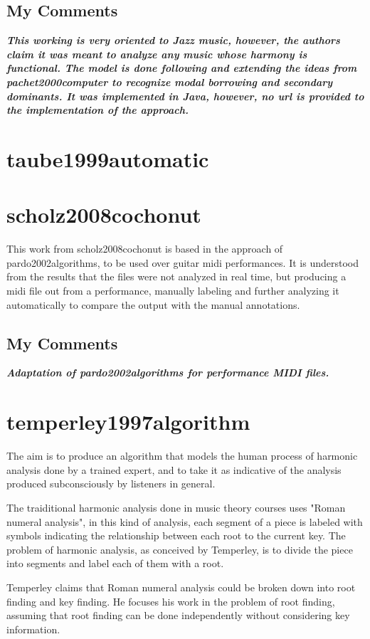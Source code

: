   \subsection{My Comments}
  \emph{\textbf{
    This working is very oriented to Jazz music, however, the authors claim it was meant to analyze any music whose harmony is functional. The model is done following and extending the ideas from pachet2000computer to recognize modal borrowing and secondary dominants. It was implemented in Java, however, no url is provided to the implementation of the approach.
  }}
\section{taube1999automatic }
\section{scholz2008cochonut }
  This work from scholz2008cochonut is based in the approach of pardo2002algorithms, to be used over guitar midi performances. It is understood from the results that the files were not analyzed in real time, but producing a midi file out from a performance, manually labeling and further analyzing it automatically to compare the output with the manual annotations.
  \subsection{My Comments}
  \emph{\textbf{
    Adaptation of pardo2002algorithms for performance MIDI files.
  }}
\section{temperley1997algorithm }
  The aim is to produce an algorithm that models the human process of harmonic analysis done by a trained expert, and to take it as indicative of the analysis produced subconsciously by listeners in general.

  The traiditional harmonic analysis done in music theory courses uses "Roman numeral analysis", in this kind of analysis, each segment of a piece is labeled with symbols indicating the relationship between each root to the current key. The problem of harmonic analysis, as conceived by Temperley, is to divide the piece into segments and label each of them with a root.

  Temperley claims that Roman numeral analysis could be broken down into root finding and key finding. He focuses his work in the problem of root finding, assuming that root finding can be done independently without considering key information.


